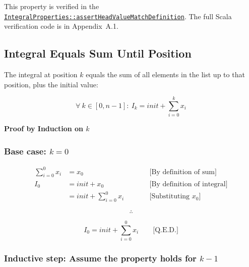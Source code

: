 {\raggedright
This property is verified in the
\href{https://github.com/thiagomata/prime-numbers/blob/master/src/main/scala/v1/chapter3/list/integral/properties/IntegralProperties.scala}{\texttt{IntegralProperties::\allowbreak assertHeadValueMatchDefinition}}.
The full Scala verification code is in Appendix~A.1.
\par}

\subsection{Integral Equals Sum Until Position}
\label{sec:integral-equals-sum}

The integral at position $k$ equals the sum of all elements in the list up
to that position, plus the initial value:

\begin{equation*}
\forall\ k \in [0, n-1]:\ I_k = \mathit{init} + \sum_{i=0}^{k} x_i
\end{equation*}

\textbf{Proof by Induction on $k$}

\subsubsection*{Base case: $k = 0$}

\begin{equation*}
\begin{aligned}
\sum_{i=0}^{0} x_i &= x_0
  & \qquad &\text{[By definition of sum]} \\
I_0 &= \mathit{init} + x_0
  & \qquad &\text{[By definition of integral]} \\
    &= \mathit{init} + \sum_{i=0}^{0} x_i
  & \qquad &\text{[Substituting } x_0]
\end{aligned}
\end{equation*}

\begin{equation*}
\therefore
\end{equation*}

\begin{equation*}
I_0 = \mathit{init} + \sum_{i=0}^{0} x_i \qquad \text{[Q.E.D.]}
\end{equation*}

\subsubsection*{Inductive step: Assume the property holds for $k-1$}

